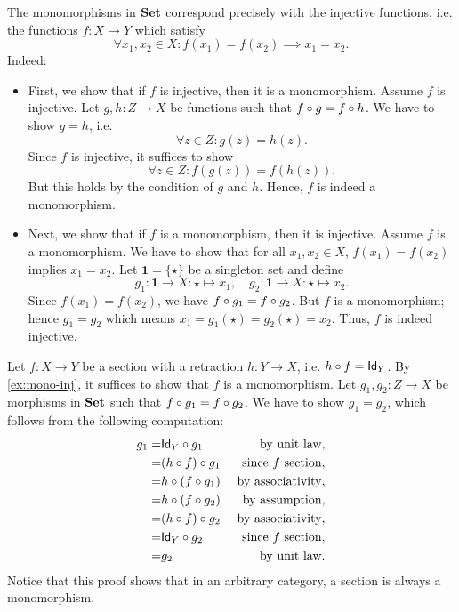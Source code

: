 \begin{solution}\label{sol:mono-inj}
The monomorphisms in $\SET$ correspond precisely with the injective functions, i.e. the functions $f:X\to Y$ which satisfy
\[
\forall x_1,x_2\in X: f(x_1)=f(x_2) \implies x_1=x_2.
\]
Indeed:
\begin{itemize}
\item First, we show that if $f$ is injective, then it is a monomorphism. Assume $f$ is injective. Let $g,h: Z\to X$ be functions such that $\co{g}{f}=\co{h}{f}$. We have to show $g=h$, i.e. 
\[
\forall z\in Z: g(z)=h(z).
\]
Since $f$ is injective, it suffices to show 
\[
\forall z\in Z: f(g(z))=f(h(z)).
\]
But this holds by the condition of $g$ and $h$. Hence, $f$ is indeed a monomorphism.
\item Next, we show that if $f$ is a monomorphism, then it is injective. Assume $f$ is a monomorphism. We have to show that for all $x_1,x_2\in X$, $f(x_1) = f(x_2)$ implies $x_1 = x_2$. Let $\mathbf{1} = \{\star\}$ be a singleton set and define
\[
g_1 : \mathbf{1}\to X: \star\mapsto x_1,\quad  g_2 : \mathbf{1}\to X: \star\mapsto x_2. 
\]
Since $f(x_1)=f(x_2)$, we have $\co{g_1}{f} = \co{g_2}{f}$. But $f$ is a monomorphism; hence $g_1 = g_2$ which means $x_1 = g_1(\star) = g_2(\star) = x_2$. Thus, $f$ is indeed injective.
\end{itemize}
\end{solution}

\begin{solution}\label{sol:sections_in_set_injective}
Let $f:X\to Y$ be a section with a retraction $h:Y\to X$, i.e. $\co{f}{h} = \Id[Y]$. By \cref{ex:mono-inj}, it suffices to show that $f$ is a monomorphism. Let  $g_1, g_2 : Z \to X$ be morphisms in $\SET$ such that $\co{g_1}{f} = \co{g_2}{f}$. We have to show $g_1=g_2$, which follows from the following computation:
\begin{eqnarray*}
g_1 =& \co{g_1}{\Id[Y]} & \text{ by unit law},\\ 
	=& \co{g_1}{(\co{f}{h})} & \text{ since $f$ section},\\ 
	=& \co{(\co{g_1}{f})}{h} & \text{ by associativity},\\
	=&  \co{(\co{g_2}{f})}{h} & \text{ by assumption},\\
	=& \co{g_2}{(\co{f}{h})} & \text{ by associativity},\\ 
	=& \co{g_2}{\Id[Y]} & \text{ since $f$ section},\\
	=& g_2 & \text{ by unit law}.
\end{eqnarray*}
Notice that this proof shows that in an arbitrary category, a section is always a monomorphism.
\end{solution}

